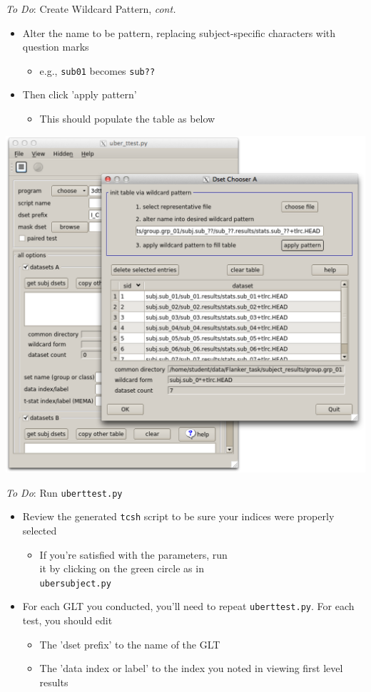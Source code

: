 \documentclass[t,12pt]{beamer}
\begin{document}
\begin{frame}{\emph{To Do}: Create Wildcard Pattern, \textit{cont.}}
\vspace{10pt}
\begin{itemize}
\setlength\itemsep{1em}
\item Alter the name to be pattern, replacing subject-specific characters with question marks
\vspace{4pt}
\begin{itemize}
\item e.g., \texttt{sub\textunderscore{}01} becomes \texttt{sub\textunderscore{}??} 
\end{itemize}
\item Then click 'apply pattern'
\vspace{4pt}
\begin{itemize}
\item This should populate the table as below
\end{itemize}
\end{itemize}
\vspace{4pt}
\centering
\includegraphics[width=.45\textwidth]{images/populated_subjs.png}
\end{frame}

\begin{frame}{\textit{To Do}: Run \texttt{uber\textunderscore{}ttest.py}}
\vspace{10pt}
\begin{itemize}
\setlength\itemsep{1em}
\item Review the generated \texttt{tcsh} script to be sure your indices were properly selected
\vspace{4pt}
\begin{itemize}
\item If you're satisfied with the parameters, run \\ it by clicking on the green circle as in \\ \texttt{uber\textunderscore{}subject.py}
\end{itemize}
\item For each GLT you conducted, you'll need to repeat \texttt{uber\textunderscore{}ttest.py}. For each test, you should edit
\vspace{4pt}
\begin{itemize}
\setlength\itemsep{0.5em}
\item The 'dset prefix' to the name of the GLT
\item The 'data index or label' to the index you noted in viewing first level results
\end{itemize}
\end{itemize}
\end{frame}
\end{document}
